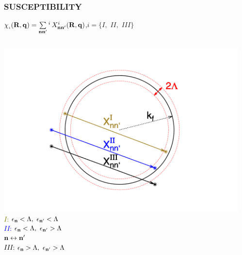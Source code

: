 \documentclass[amssymb,amsmath]{beamer}
\newcommand{\black}{\textcolor{black}}
\newcommand{\blue}{\textcolor{blue}}
\newcommand{\olive}{\textcolor{olive}}
\begin{document}
\begin{frame} \frametitle{SUSCEPTIBILITY} 
$\chi_{_i}({\bf R},{\bf q})=\sum\limits_{{\bf n}{\bf n}'} {}^{i}\, X^{i}_{{\bf n}{\bf n}'}({\bf R},{\bf q})$,\quad $i=\{I,\,\, II,\,\, III\}$
\begin{columns}
\begin{column}{0.4\textwidth}
	\includegraphics[scale=0.18]{./figures/sus_connection.png}\\
    \olive{$I$: $\epsilon_{{\bf n}}< \Lambda,\,\,\epsilon_{{\bf n}'} < \Lambda$} \\
	\blue{$II$: $\epsilon_{{\bf n}}< \Lambda,\,\,\epsilon_{{\bf n}'} > \Lambda$\\\hspace{1cm} ${\bf n} \leftrightarrow {\bf n}'$} \\
	\black{$III$: $\epsilon_{{\bf n}}> \Lambda,\,\,\epsilon_{{\bf n}'} > \Lambda$}
\end{column}
\begin{column}{0.6\textwidth}
\end{column}
\end{columns}
\end{frame}
\end{document}
